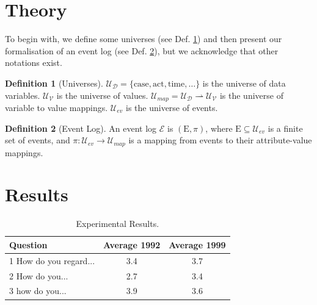 \documentclass{sis-dc}
\theoremstyle{definition}
\newtheorem{defn}{Definition}
\newcommand{\universe}[1]{\mathcal{U}_{#1}} %
\newcommand{\uevents}{\universe{\textit{ev}}}
\newcommand{\udata}{\universe{\mathcal{D}}}
\newcommand{\uvalues}{\universe{\mathcal{V}}}
\newcommand{\umaps}{\universe{\textit{map}}}
\begin{document}
\section{Theory}

To begin with, we define some universes (see Def. \ref{def:universe}) and then present our formalisation of an event log (see Def. \ref{def:eventlog}), but we acknowledge that other notations exist.

\begin{defn}[Universes]
$\udata = \{ \text{case},\text{act},\text{time}, \dots \}$ is the universe of data variables.
$\uvalues$ is the universe of values.
$\umaps = \udata \rightharpoonup \uvalues$ is the universe of variable to value mappings. 
$\uevents$ is the universe of events. 
\label{def:universe}
\end{defn}


\begin{defn}[Event Log]
An event log $\mathcal{E}$ is $(\text{E}, \pi)$, where $\text{E} \subseteq \uevents$ is a finite set of events, and $\pi : \uevents \rightarrow \umaps$ is a mapping from events to their attribute-value mappings.
\label{def:eventlog}
\end{defn}

\section{Results}

\begin{table}[b] %
\begin{tabular}{ |l|c|c| } 
\hline
\multicolumn{1}{|l|}{Question} &  \multicolumn{1}{|l|}{Average 1992} & \multicolumn{1}{|l|}{Average 1999} \\
\hline
 1 How do you regard... & 3.4 & 3.7 \\ 
 2 How do you... & 2.7 & 3.4 \\ 
 3 how do you... & 3.9 & 3.6 \\ 
 \hline
\end{tabular}
\caption{Experimental Results.}
\end{table}

\lipsum[5]
\end{document}
